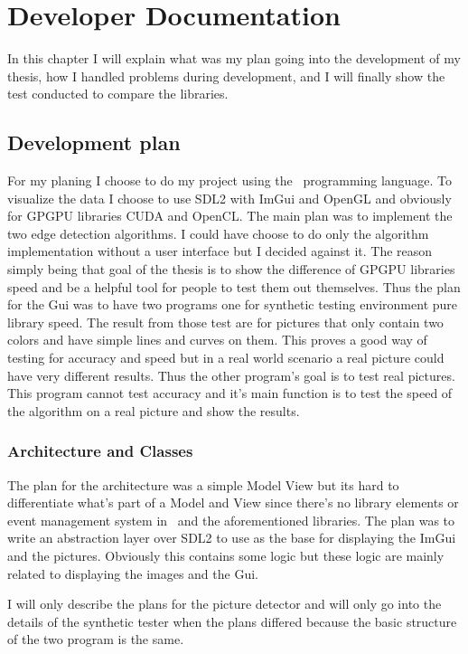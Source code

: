 \chapter{Developer Documentation}

In this chapter I will explain what was my plan going into the development of my thesis, how I handled problems during development, and I will finally show the test conducted to compare the libraries.

\section{Development plan}

For my planing I choose to do my project using the \CC\ programming language. To visualize the data I choose to use \ac{SDL2} with \ac{ImGui} and OpenGL and obviously for \ac{GPGPU} libraries CUDA and OpenCL. The main plan was to implement the two edge detection algorithms. I could have choose to do only the algorithm implementation without a user interface but I decided against it. The reason simply being that goal of the thesis is to show the difference of \ac{GPGPU} libraries speed and be a helpful tool for people to test them out themselves. Thus the plan for the Gui was to have two programs one for synthetic testing environment pure library speed. The result from those test are for pictures that only contain two colors and have simple lines and curves on them. This proves a good way of testing for accuracy and speed but in a real world scenario a real picture could have very different results. Thus the other program's goal is to test real pictures. This program cannot test accuracy and it's main function is to test the speed of the algorithm on a real picture and show the results.


\subsection{Architecture and Classes}

The plan for the architecture was a simple Model View but its hard to differentiate what's part of a Model and View since there's no library elements or event management system in \CC\ and the aforementioned libraries. The plan was to write an abstraction layer over \ac{SDL2} to use as the base for displaying the \ac{ImGui} and the pictures. Obviously this contains some logic but these logic are mainly related to displaying the images and the Gui.

I will only describe the plans for the picture detector and will only go into the details of the synthetic tester when the plans differed because the basic structure of the two program is the same.

